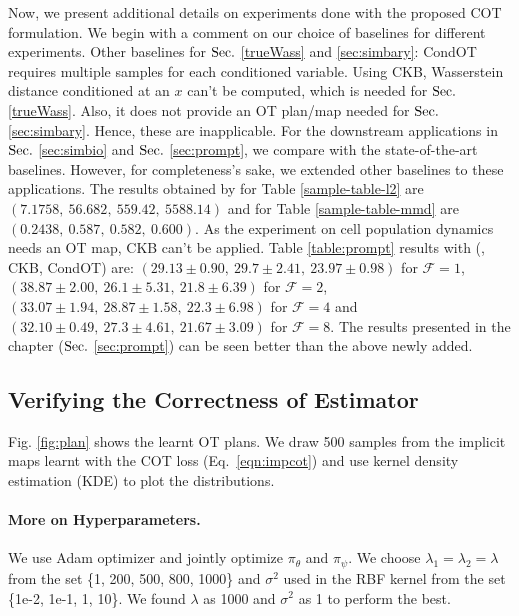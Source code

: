 Now, we present additional details on experiments done with the proposed COT formulation. We begin with a comment on our choice of baselines for different experiments. Other baselines for $\S$ \ref{trueWass} and \ref{sec:simbary}: CondOT requires multiple samples for each conditioned variable. Using CKB, Wasserstein distance conditioned at an $x$ can't be computed, which is needed for $\S$ \ref{trueWass}. Also, it does not provide an OT plan/map needed for $\S$ \ref{sec:simbary}. Hence, these are inapplicable.
For the downstream applications in $\S$ \ref{sec:simbio} and $\S$ \ref{sec:prompt}, we compare with the state-of-the-art baselines. However, for completeness's sake, we extended other baselines to these applications. The results obtained by \cite{Tabak21} for Table \ref{sample-table-l2} are $(7.1758, ~56.682,~559.42,~5588.14)$ and for Table \ref{sample-table-mmd} are $(0.2438,~0.587,~0.582,~0.600)$. As the experiment on cell population dynamics needs an OT map, CKB can't be applied. Table \ref{table:prompt} results with (\cite{Tabak21}, CKB, CondOT) are: $ (29.13\pm0.90, ~29.7\pm2.41,~ 23.97\pm0.98)$ for $\mathcal{F}=1$, $(38.87\pm2.00, ~26.1\pm 5.31, ~21.8\pm6.39)$ for $\mathcal{F}=2$, $(33.07\pm1.94,~28.87\pm1.58,~22.3\pm 6.98)$ for $\mathcal{F}=4$ and $(32.10\pm0.49, ~27.3\pm4.61,~21.67\pm 3.09)$ for $\mathcal{F}=8$. The results presented in the chapter ($\S$ \ref{sec:prompt}) can be seen better than the above newly added.

\subsection{Verifying the Correctness of Estimator}
Fig. \ref{fig:plan} shows the learnt OT plans. We draw 500 samples from the implicit maps learnt with the COT loss (Eq.~\ref{eqn:impcot}) and use kernel density estimation (KDE) to plot the distributions.

\paragraph{More on Hyperparameters.}
We use Adam optimizer and jointly optimize $\pi_\theta$ and $\pi_\psi$. We choose $\lambda_1=\lambda_2=\lambda$ from the set \{1, 200, 500, 800, 1000\} and $\sigma^2$ used in the RBF kernel from the set \{1e-2, 1e-1, 1, 10\}. We found $\lambda$ as 1000 and $\sigma^2$ as 1 to perform the best.


